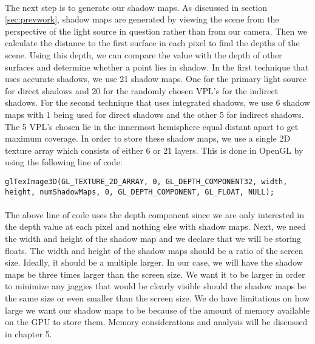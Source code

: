 \paragraph{}
The next step is to generate our shadow maps.  As discussed in section \ref{sec:prevwork}, shadow maps are generated by viewing the scene from the perspective of the light source in question rather than from our camera.  Then we calculate the distance to the first surface in each pixel to find the depths of the scene.  Using this depth, we can compare the value with the depth of other surfaces and determine whether a point lies in shadow.  In the first technique that uses accurate shadows, we use 21 shadow maps. One for the primary light source for direct shadows and 20 for the randomly chosen VPL's for the indirect shadows.  For the second technique that uses integrated shadows, we use 6 shadow maps with 1 being used for direct shadows and the other 5 for indirect shadows.  The 5 VPL's chosen lie in the innermost hemisphere equal distant apart to get maximum coverage.  In order to store these shadow maps, we use a single 2D texture array which consists of either 6 or 21 layers.  This is done in OpenGL by using the following line of code:

\begin{lstlisting}
glTexImage3D(GL_TEXTURE_2D_ARRAY, 0, GL_DEPTH_COMPONENT32, width, 
height, numShadowMaps, 0, GL_DEPTH_COMPONENT, GL_FLOAT, NULL);
\end{lstlisting}
\paragraph{}
The above line of code uses the depth component since we are only interested in the depth value at each pixel and nothing else with shadow maps.  Next, we need the width and height of the shadow map and we declare that we will be storing floats.  The width and height of the shadow maps should be a ratio of the screen size.  Ideally, it should be a multiple larger.  In our case, we will have the shadow maps be three times larger than the screen size.  We want it to be larger in order to minimize any jaggies that would be clearly visible should the shadow maps be the same size or even smaller than the screen size.  We do have limitations on how large we want our shadow maps to be because of the amount of memory available on the GPU to store them.  Memory considerations and analysis will be discussed in chapter 5.  

